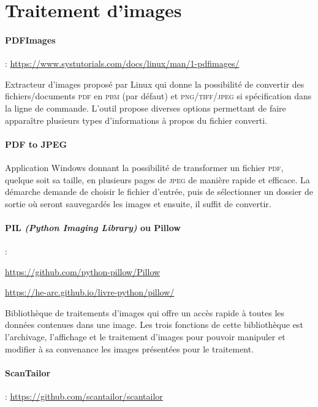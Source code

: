 \section{Traitement d'images}
\paragraph{PDFImages} : \url{https://www.systutorials.com/docs/linux/man/1-pdfimages/}

Extracteur d'images proposé par Linux qui donne la possibilité de convertir des fichiers/documents \textsc{pdf} en \textsc{pbm} (par défaut) et \textsc{png}/\textsc{tiff}/\textsc{jpeg} si spécification dans la ligne de commande. L'outil propose diverses options permettant de faire apparaître plusieurs types d'informations à propos du fichier converti.

\paragraph{PDF to JPEG}
Application Windows donnant la possibilité de transformer un fichier \textsc{pdf}, quelque soit sa taille, en plusieurs pages de \textsc{jpeg} de manière rapide et efficace. La démarche demande de choisir le fichier d'entrée, puis de sélectionner un dossier de sortie où seront sauvegardés les images et ensuite, il suffit de convertir.

\paragraph{PIL \textit{(Python Imaging Library)} ou Pillow} :

\url{https://github.com/python-pillow/Pillow}

\url{https://he-arc.github.io/livre-python/pillow/}

Bibliothèque de traitements d'images qui offre un accès rapide à toutes les données contenues dans une image. Les trois fonctions de cette bibliothèque est l'archivage, l'affichage et le traitement d'images pour pouvoir manipuler et modifier à sa convenance les images présentées pour le traitement.

\paragraph{ScanTailor} : \url{https://github.com/scantailor/scantailor}


